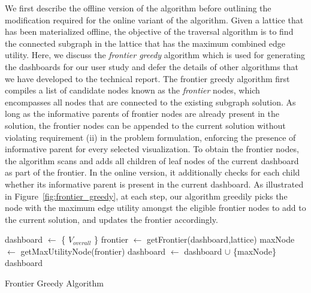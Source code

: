  We first describe the offline version of the algorithm before outlining the modification required for the online variant of the algorithm. Given a lattice that has been materialized offline, the objective of the traversal algorithm is to find the connected subgraph in the lattice that has the maximum combined edge utility. Here, we discuss the \textit{frontier greedy} algorithm which is used for generating the dashboards for our user study and defer the details of other algorithms that we have developed to the technical report. The frontier greedy algorithm first compiles a list of candidate nodes known as the \textit{frontier} nodes, which encompasses all nodes that are connected to the existing subgraph solution. As long as the informative parents of frontier nodes are already present in the solution, the frontier nodes can be appended to the current solution without violating requirement (ii) in the problem formulation, enforcing the presence of informative parent for every selected visualization. To obtain the frontier nodes, the algorithm scans and adds all children of leaf nodes of the current dashboard as part of the frontier. In the online version, it additionally checks for each child whether its informative parent is present in the current dashboard. As illustrated in Figure~\ref{fig:frontier_greedy}, at each step, our algorithm greedily picks the node with the maximum edge utility amongst the eligible frontier nodes to add to the current solution, and updates the frontier accordingly.
\begin{algorithm}
  \begin{algorithmic}[1]
  \State dashboard $\gets$ \{ $V_{overall}$ \}
      \State frontier $\gets$ getFrontier(dashboard,lattice)
      \State maxNode $\gets$ getMaxUtilityNode(frontier)
      \State dashboard $\gets$ dashboard $\cup$ \{maxNode\}
  \EndWhile
  \Return dashboard
  \EndProcedure
  \end{algorithmic}
  \caption{Frontier Greedy Algorithm}\label{algo:frontier_greedy}
\end{algorithm}
\vspace{-15pt}
